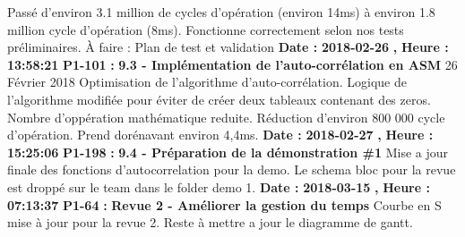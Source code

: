 \documentclass{article}%
\begin{document}
Passé d'environ 3.1 million de cycles d'opération (environ 14ms) à environ 1.8 million cycle d'opération (8ms).\newline%
Fonctionne correctement selon nos tests préliminaires.\newline%
À faire : Plan de test et validation\newline%
\newline%
%
\textbf{Date : }%
\textbf{2018{-}02{-}26}%
\textbf{,}%
\textbf{ Heure : }%
\textbf{13:58:21}%
\newline%
%
\textbf{P1{-}101 }%
\textbf{ : }%
\textbf{ 9.3 {-} Implémentation de l'auto{-}corrélation en ASM}%
\newline%
\newline%
%
26 Février 2018\newline%
Optimisation de l'algorithme d'auto{-}corrélation. Logique de l'algorithme modifiée pour éviter de créer deux tableaux contenant des zeros. Nombre d'oppération mathématique reduite.\newline%
Réduction d'environ 800 000 cycle d'opération. Prend dorénavant environ 4,4ms.\newline%
\newline%
%
\textbf{Date : }%
\textbf{2018{-}02{-}27}%
\textbf{,}%
\textbf{ Heure : }%
\textbf{15:25:06}%
\newline%
%
\textbf{P1{-}198 }%
\textbf{ : }%
\textbf{ 9.4 {-} Préparation de la démonstration \#1}%
\newline%
\newline%
%
Mise a jour finale des fonctions d'autocorrelation pour la demo. Le schema bloc pour la revue est droppé sur le team dans le folder demo 1.\newline%
\newline%
%
\textbf{Date : }%
\textbf{2018{-}03{-}15}%
\textbf{,}%
\textbf{ Heure : }%
\textbf{07:13:37}%
\newline%
%
\textbf{P1{-}64 }%
\textbf{ : }%
\textbf{ Revue 2 {-} Améliorer la gestion du temps}%
\newline%
\newline%
%
Courbe en S mise à jour pour la revue 2. Reste à mettre a jour le diagramme de gantt.\newline%
\newline%
%
\newpage

%
\end{document}
